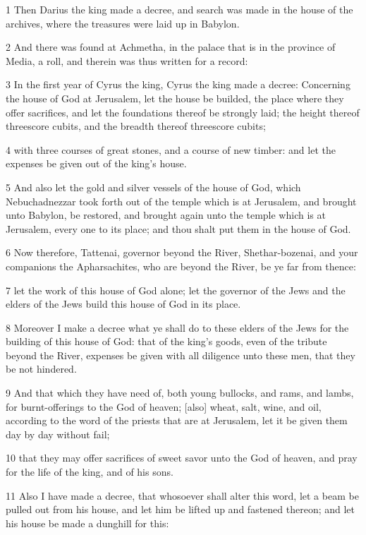 \par 1 Then Darius the king made a decree, and search was made in the house of the archives, where the treasures were laid up in Babylon.
\par 2 And there was found at Achmetha, in the palace that is in the province of Media, a roll, and therein was thus written for a record:
\par 3 In the first year of Cyrus the king, Cyrus the king made a decree: Concerning the house of God at Jerusalem, let the house be builded, the place where they offer sacrifices, and let the foundations thereof be strongly laid; the height thereof threescore cubits, and the breadth thereof threescore cubits;
\par 4 with three courses of great stones, and a course of new timber: and let the expenses be given out of the king's house.
\par 5 And also let the gold and silver vessels of the house of God, which Nebuchadnezzar took forth out of the temple which is at Jerusalem, and brought unto Babylon, be restored, and brought again unto the temple which is at Jerusalem, every one to its place; and thou shalt put them in the house of God.
\par 6 Now therefore, Tattenai, governor beyond the River, Shethar-bozenai, and your companions the Apharsachites, who are beyond the River, be ye far from thence:
\par 7 let the work of this house of God alone; let the governor of the Jews and the elders of the Jews build this house of God in its place.
\par 8 Moreover I make a decree what ye shall do to these elders of the Jews for the building of this house of God: that of the king's goods, even of the tribute beyond the River, expenses be given with all diligence unto these men, that they be not hindered.
\par 9 And that which they have need of, both young bullocks, and rams, and lambs, for burnt-offerings to the God of heaven; [also] wheat, salt, wine, and oil, according to the word of the priests that are at Jerusalem, let it be given them day by day without fail;
\par 10 that they may offer sacrifices of sweet savor unto the God of heaven, and pray for the life of the king, and of his sons.
\par 11 Also I have made a decree, that whosoever shall alter this word, let a beam be pulled out from his house, and let him be lifted up and fastened thereon; and let his house be made a dunghill for this:
